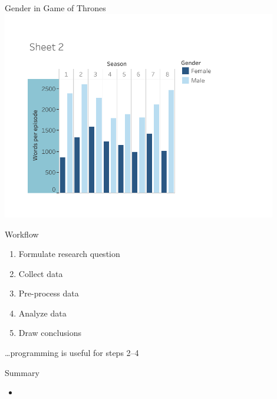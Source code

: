 \documentclass{beamer}
\begin{document}
\begin{frame}{Gender in Game of Thrones}\centering
	\includegraphics[width=0.9\textwidth]{fig/got}
\end{frame}

\begin{frame}{Workflow}
	\begin{enumerate}
		\item Formulate research question
		\item Collect data
		\item Pre-process data
		\item Analyze data
		\item Draw conclusions
	\end{enumerate}

	\pause
	\dots programming is useful for steps 2--4
\end{frame}



\begin{frame}{Summary}
	\begin{itemize}
		\item 
	\end{itemize}
\end{frame}
\end{document}
